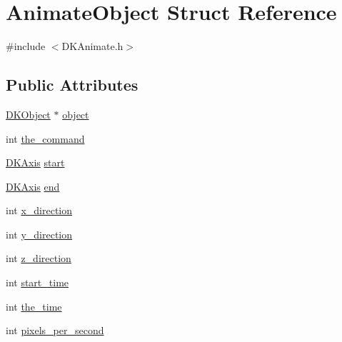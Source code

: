 \hypertarget{struct_animate_object}{\section{Animate\-Object Struct Reference}
\label{struct_animate_object}
}


{\ttfamily \#include $<$D\-K\-Animate.\-h$>$}

\subsection*{Public Attributes}
\begin{DoxyCompactItemize}
\item 
\hyperlink{class_d_k_object}{D\-K\-Object} $\ast$ \hyperlink{struct_animate_object_a0ad4574ce54733aa56db4fee2365afe1}{object}
\item 
int \hyperlink{struct_animate_object_a4a2eff654ba594cdb3793873367ab25a}{the\-\_\-command}
\item 
\hyperlink{class_d_k_axis}{D\-K\-Axis} \hyperlink{struct_animate_object_a9a547e8447ad948053a1738f2288b4e9}{start}
\item 
\hyperlink{class_d_k_axis}{D\-K\-Axis} \hyperlink{struct_animate_object_a6489a3b6dcc15d7d0527055353ed5589}{end}
\item 
int \hyperlink{struct_animate_object_ae6a14cccf996f8d835a365722cc427ab}{x\-\_\-direction}
\item 
int \hyperlink{struct_animate_object_a214d10261c1c05ceeabaeba9215bfbdd}{y\-\_\-direction}
\item 
int \hyperlink{struct_animate_object_ad17313497e1b7d2fd496eff00b260f74}{z\-\_\-direction}
\item 
int \hyperlink{struct_animate_object_a2534ec64884027d6495002a470e63d34}{start\-\_\-time}
\item 
int \hyperlink{struct_animate_object_a0ac2c2373afec4a28041721f159b4456}{the\-\_\-time}
\item 
int \hyperlink{struct_animate_object_a105e8e769f26ff4d0e6a6ef95bf40342}{pixels\-\_\-per\-\_\-second}
\end{DoxyCompactItemize}


